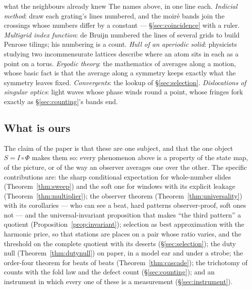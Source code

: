 \begin{lookup}{what the neighbours already knew}
The names above, in one line each. \emph{Indicial method}: draw each
grating's lines numbered, and the moir\'e bands join the crossings whose
numbers differ by a constant --- \S\ref{sec:coincidence} with a ruler.
\emph{Multigrid index function}: de Bruijn numbered the lines of several
grids to build Penrose tilings; his numbering is a count. \emph{Hull of an
aperiodic solid}: physicists studying two incommensurate lattices describe
where an atom sits in each as a point on a torus. \emph{Ergodic theory}:
the mathematics of averages along a motion, whose basic fact is that the
average along a symmetry keeps exactly what the symmetry leaves fixed.
\emph{Convergents}: the lookup of \S\ref{sec:selection}.
\emph{Dislocations of singular optics}: light waves whose phase winds
round a point, whose fringes fork exactly as \S\ref{sec:counting}'s bands
end.
\end{lookup}

\subsection{What is ours}
The claim of the paper is that these are one subject, and that the one
object $S=I\circ\Phi$ makes them so: every phenomenon above is a property
of the state map, of the picture, or of the way an observer averages one
over the other. The specific contributions are: the sharp conditional
expectation for whole-number slides (Theorem~\ref{thm:sweep}) and the soft
one for windows with its explicit leakage (Theorem~\ref{thm:multiplier});
the observer theorem (Theorem~\ref{thm:universality}) with its corollaries
--- who can see a beat, hard patterns observer-proof, soft ones not ---
and the universal-invariant proposition that makes ``the third pattern''
a quotient (Proposition~\ref{prop:invariant}); selection as best
approximation with the harmonic price, so that stations are places on a
pair whose ratio varies, and the threshold on the complete quotient with
its deserts (\S\ref{sec:selection}); the duty null
(Theorem~\ref{thm:dutynull}) on paper, in a model ear and under a strobe;
the order-four theorem for beats of beats (Theorem~\ref{thm:cascade}); the
trichotomy of counts with the fold law and the defect count
(\S\ref{sec:counting}); and an instrument in which every one of these is a
measurement (\S\ref{sec:instrument}).

